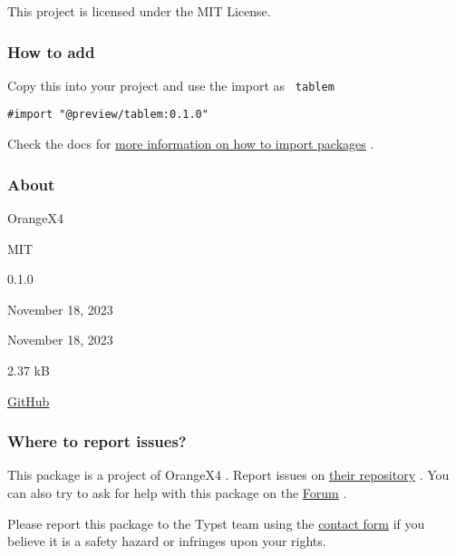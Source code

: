 This project is licensed under the MIT License.

\subsubsection{How to add}\label{how-to-add}

Copy this into your project and use the import as \texttt{\ tablem\ }

\begin{verbatim}
#import "@preview/tablem:0.1.0"
\end{verbatim}



Check the docs for
\href{https://typst.app/docs/reference/scripting/\#packages}{more
information on how to import packages} .

\subsubsection{About}\label{about}

\begin{description}
\tightlist
\item[Author :]
OrangeX4
\item[License:]
MIT
\item[Current version:]
0.1.0
\item[Last updated:]
November 18, 2023
\item[First released:]
November 18, 2023
\item[Archive size:]
2.37 kB
\href{https://packages.typst.org/preview/tablem-0.1.0.tar.gz}{\pandocbounded{}}
\item[Repository:]
\href{https://github.com/OrangeX4/typst-tablem}{GitHub}
\end{description}

\subsubsection{Where to report issues?}\label{where-to-report-issues}

This package is a project of OrangeX4 . Report issues on
\href{https://github.com/OrangeX4/typst-tablem}{their repository} . You
can also try to ask for help with this package on the
\href{https://forum.typst.app}{Forum} .

Please report this package to the Typst team using the
\href{https://typst.app/contact}{contact form} if you believe it is a
safety hazard or infringes upon your rights.

